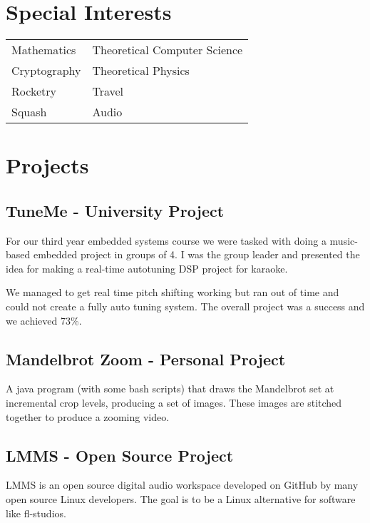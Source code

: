 \documentclass[8pt]{extarticle}
\begin{document}
\begin{multicols}{2}
\section{Special Interests}
\begin{center}
\renewcommand{\arraystretch}{1.5}
\begin{tabular}{l l}
	Mathematics & Theoretical Computer Science \\
	Cryptography & Theoretical Physics \\
	Rocketry & Travel \\
	Squash & Audio \\
\end{tabular}
\end{center}

\vfill\null
\columnbreak
\section{Projects}

\subsection{TuneMe - University Project}

For our third year embedded systems course we were
tasked with doing a music-based embedded project in
groups of 4. I was the group leader and presented the idea
for making a real-time autotuning DSP project for karaoke.

We managed to get real time pitch shifting working but ran
out of time and could not create a fully auto tuning system.
The overall project was a success and we achieved 73\%.

\subsection{Mandelbrot Zoom - Personal Project}

A java program (with some bash scripts) that draws the
Mandelbrot set at incremental crop levels, producing a set
of images. These images are stitched together to produce a
zooming video.

\subsection{LMMS - Open Source Project}

LMMS is an open source digital audio workspace developed
on GitHub by many open source Linux developers. The goal
is to be a Linux alternative for software like fl-studios.


\end{multicols}
\end{document}
